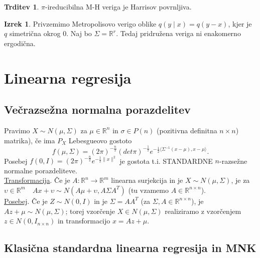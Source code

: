 \documentclass[a4paper, 12pt]{book}
\theoremstyle{definition}
\newtheorem{claim}[counter]{Trditev}
\newtheorem{theorem}[counter]{Izrek}
\theoremstyle{remark}
\newcommand{\R}{\mathbb{R}}
\begin{document}
\begin{claim}
  $\pi$-ireducibilna M-H veriga je Harrisov povrnljiva.
\end{claim}
\begin{theorem}
  Privzemimo Metropolisovo verigo oblike $q(y \mid x) = q(y - x)$, kjer je $q$ simetrična okrog $0$.
  Naj bo $\Sigma = \R^r$.
  Tedaj pridružena veriga  ni enakomerno ergodična.
\end{theorem}



\section{Linearna regresija}

\subsection{Večrazsežna normalna porazdelitev}

Pravimo $X \sim N(\mu, \Sigma)$ za $\mu \in \R^n$ in $\sigma \in P(n)$
(pozitivna definitna $n \times n$) matrika),
če ima $P_X$ Lebesgueovo gostoto 
\begin{equation*}
  f(\mu, \Sigma) = (2 \pi)^{-\frac{n}{2}} (det \pi)^{-\frac{1}{2}}
  e^{-\frac{1}{2} \langle \Sigma^{-1} (x-\mu), x-\mu \rangle}.
\end{equation*}
Posebej $f(0, I) = (2 \pi)^{-\frac{n}{2}} e^{-\frac{1}{2} \lVert x \rVert^2}$
je gostota t.i. STANDARDNE $n$-razsežne normalne porazdeliteve. \\
\underline{Transformacija}.
Če je $A: \R^n \to \R^m$ linearna surjekcija in je $X \sim N(\mu, \Sigma)$,
je za $\upsilon \in \R^m \quad Ax + \upsilon \sim N(A \mu + \upsilon, A \Sigma A^T)$
(tu vzamemo $A \in \R^{n \times n}$). \\
\underline{Posebej}.
Če je $Z \sim N(0, I)$ in je $\Sigma = A A^T$ (za $\Sigma, A \in \R^{n \times n}$),
je \\
$Az + \mu \sim N(\mu, \Sigma)$;
torej vzorčenje $X \in N(\mu, \Sigma)$ realiziramo z vzorčenjem $z \in N(0, I_{n \times n})$
in transformacijo $x = Az + \mu$.

\subsection{Klasična standardna linearna regresija in MNK}
\end{document}
